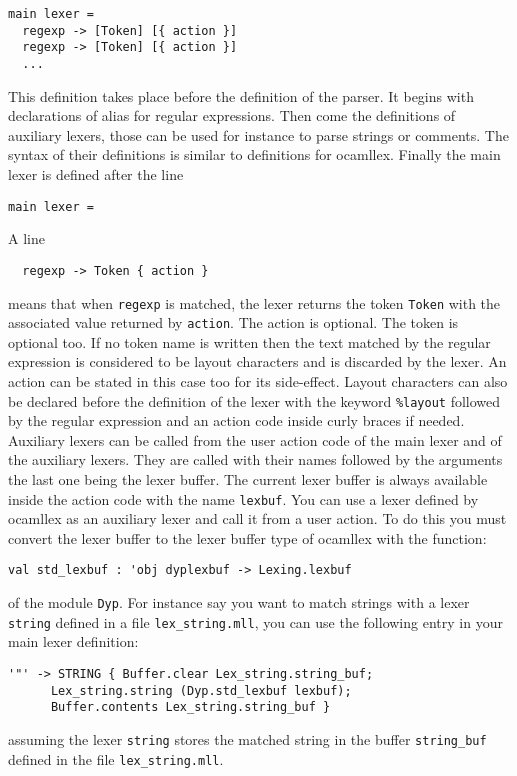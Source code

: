 \documentclass[12pt]{article}
\begin{document}
{\begin{verbatim}
main lexer =
  regexp -> [Token] [{ action }]
  regexp -> [Token] [{ action }]
  ...
\end{verbatim}
This definition takes place before the definition of the parser. It begins with declarations of alias for regular expressions. Then come the definitions of auxiliary lexers, those can be used for instance to parse strings or comments. The syntax of their definitions is similar to definitions for ocamllex. Finally the main lexer is defined after the line
\begin{verbatim}
main lexer =
\end{verbatim}
A line
\begin{verbatim}
  regexp -> Token { action }
\end{verbatim}
means that when \verb|regexp| is matched, the lexer returns the token \verb|Token| with the associated value returned by \verb|action|. The action is optional. The token is optional too. If no token name is written then the text matched by the regular expression is considered to be layout characters and is discarded by the lexer. An action can be stated in this case too for its side-effect.
Layout characters can also be declared before the definition of the lexer with the keyword \verb|%layout| followed by the regular expression and an action code inside curly braces if needed. Auxiliary lexers can be called from the user action code of the main lexer and of the auxiliary lexers. They are called with their names followed by the arguments the last one being the lexer buffer. The current lexer buffer is always available inside the action code with the name \verb|lexbuf|. You can use a lexer defined by ocamllex as an auxiliary lexer and call it from a user action. To do this you must convert the lexer buffer to the lexer buffer type of ocamllex with the function:
\begin{verbatim}
val std_lexbuf : 'obj dyplexbuf -> Lexing.lexbuf
\end{verbatim}
of the module \verb|Dyp|. For instance say you want to match strings with a lexer \verb|string| defined in a file \verb|lex_string.mll|, you can use the following entry in your main lexer definition:
\begin{verbatim}
'"' -> STRING { Buffer.clear Lex_string.string_buf;
      Lex_string.string (Dyp.std_lexbuf lexbuf);
      Buffer.contents Lex_string.string_buf }
\end{verbatim}
assuming the lexer \verb|string| stores the matched string in the buffer \verb|string_buf| defined in the file \verb|lex_string.mll|.\\

}
\end{document}
